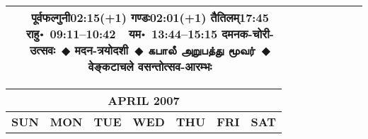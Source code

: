 \documentclass[a3paper,12pt,landscape]{article}
\newcommand{\eventsep}{~$\Diamondblack$ }
\newcommand{\To}{\hspace{1pt}\raisebox{0pt}{\tiny\RIGHTarrow}\hspace{1pt}}
\newcommand{\tamil}[1]{%
{\fontspec[Scale=0.9,FakeStretch=0.9]{Noto Sans Tamil} \footnotesize #1}}
\newcommand{\rahuyama}[2]{%
{राहु॰~\textsf{#1}~~यम॰~\textsf{#2}}
}
\begin{document}
\begin{center}
\begin{tabular}{|c|c|c|c|c|c|c|}
{{\mbox{पूर्वफल्गुनी\To{}\textsf{02:15(+1)\hspace{2ex}}}}%
{\mbox{गण्डः\To{}\textsf{02:01(+1)\hspace{2ex}}}}%
{\mbox{तैतिलम्\To{}\textsf{17:45\hspace{2ex}}}}}%
{\rahuyama{09:11--10:42}{13:44--15:15}}%
{दमनक-चोरी-उत्सवः\eventsep मदन-त्रयोदशी\eventsep \tamil{கபாலீ அறுபத்து மூவர்}\eventsep वेङ्कटाचले वसन्तोत्सव-आरम्भः}
\\ \hline %
\end{tabular}



\begin{tabular}{|c|c|c|c|c|c|c|}
\multicolumn{7}{c}{\Large \bfseries \sffamily APRIL 2007}\\[3mm]
\hline
\textbf{\textsf{SUN}} & \textbf{\textsf{MON}} & \textbf{\textsf{TUE}} & \textbf{\textsf{WED}} & \textbf{\textsf{THU}} & \textbf{\textsf{FRI}} & \textbf{\textsf{SAT}} \\ \hline


\end{tabular}
\end{center}
\end{document}
